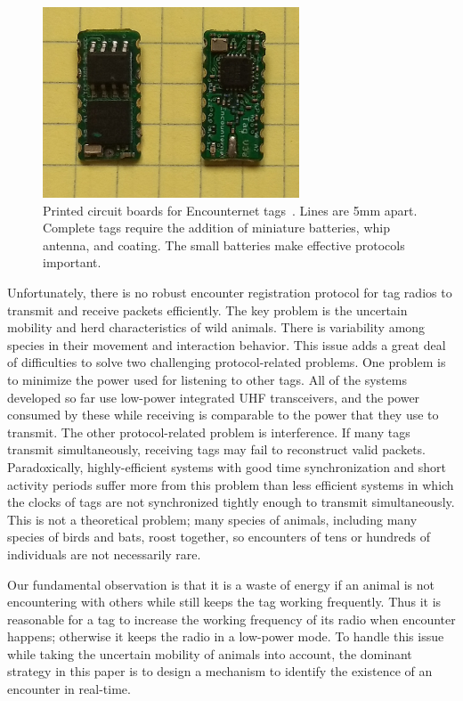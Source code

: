 \begin{figure}[!t]
    \centering
    \includegraphics[width=3in]{figures/tag}
    \caption{Printed circuit boards for Encounternet tags~\protect\cite{Menhill2012NovelTelemetry}.
    Lines are 5mm apart. Complete tags require the addition of miniature batteries, whip antenna, and
    coating. The small batteries make effective protocols important.}
    \label{tags}
\end{figure}

Unfortunately, there is no robust encounter registration protocol 
for tag radios to transmit and receive packets efficiently.
The key problem is the uncertain mobility and herd characteristics of wild 
animals. There is variability among species in their movement and 
interaction behavior. This issue adds a great deal of difficulties to
solve two challenging protocol-related problems. 
One problem is to minimize the power used for listening to other tags. 
All of the systems developed so far use low-power integrated
UHF transceivers, and the power consumed by these while receiving is 
comparable to the power that they use to transmit. 
The other protocol-related problem is interference. 
If many tags transmit simultaneously, receiving tags may fail
to reconstruct valid packets. Paradoxically, highly-efficient 
systems with good time synchronization and short activity
periods suffer more from this problem than less efficient systems 
in which the clocks of tags are not synchronized tightly
enough to transmit simultaneously. This is not a theoretical problem; 
many species of animals, including many species of
birds and bats, roost together, so encounters of tens or hundreds 
of individuals are not necessarily rare.

Our fundamental observation is that it is a waste of 
energy if an animal is not encountering with others
while still keeps the tag working frequently.
Thus it is reasonable for a tag to
increase the working frequency of its radio when 
encounter happens; otherwise it keeps
the radio in a low-power mode. 
To handle this issue while taking the uncertain mobility of animals into account, 
the dominant strategy in this paper is to design a mechanism
to identify the existence of an encounter in real-time. 

